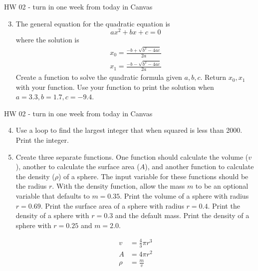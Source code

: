 \documentclass[10pt]{beamer}
\begin{document}
\begin{frame}[fragile]{HW 02 - turn in one week from today in Canvas}
\begin{enumerate}
\setcounter{enumi}{2}
\item The general equation for the quadratic equation is
\begin{equation}
ax^2 + bx + c = 0 
\end{equation}
where the solution is 
\begin{align}
x_0 = \frac{-b + \sqrt{b^2 - 4ac}}{2a} \\
x_1 = \frac{-b - \sqrt{b^2 - 4ac}}{2a}
\end{align}
Create a function to solve the quadratic formula given $a, b, c$. Return $x_0, x_1$ with your function. Use your function to print the solution when $a = 3.3, b = 1.7, c = -9.4$.

\end{enumerate}
\end{frame}

\begin{frame}[fragile]{HW 02 - turn in one week from today in Canvas}
\begin{enumerate}
\setcounter{enumi}{3}
\item Use a loop to find the largest integer that when squared is less than 2000. Print the integer.
\item Create three separate functions. One function should calculate the volume ($v$), another to calculate the surface area ($A$), and another function to calculate the density ($\rho$) of a sphere. The input variable for these functions should be the radius $r$. With the density function, allow the mass $m$ to be an optional variable that defaults to $m=0.35$.  Print the volume of a sphere with radius $r=0.69$. Print the surface area of a sphere with radius $r=0.4$. Print the density of a sphere with $r = 0.3$ and the default mass. Print the density of a sphere with $r = 0.25$ and $m=2.0$. 

\begin{align}
v &= \frac{4}{3}\pi r^3 \\
A &= 4 \pi r^2 \\
\rho &= \frac{m}{v}
\end{align}
\end{enumerate}
\end{frame}
\end{document}
